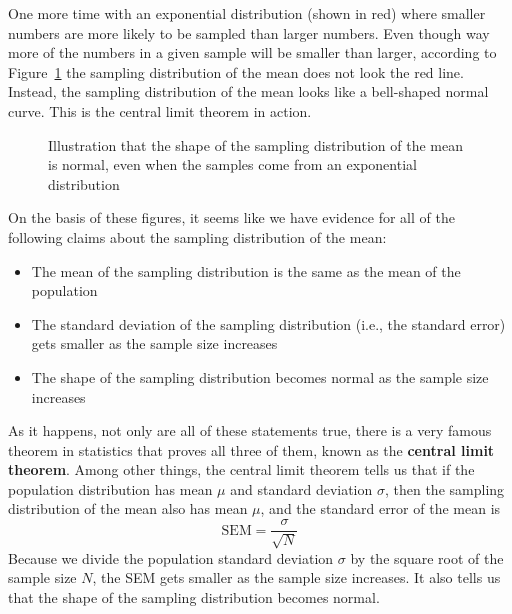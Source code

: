 \documentclass[
  letterpaper,
  DIV=11,
  numbers=noendperiod]{scrreprt}
\begin{document}
One more time with an exponential distribution (shown in red) where
smaller numbers are more likely to be sampled than larger numbers. Even
though way more of the numbers in a given sample will be smaller than
larger, according to Figure~\ref{fig-4samplemeanExp} the sampling
distribution of the mean does not look the red line. Instead, the
sampling distribution of the mean looks like a bell-shaped normal curve.
This is the central limit theorem in action.

\begin{figure}


\caption{\label{fig-4samplemeanExp}Illustration that the shape of the
sampling distribution of the mean is normal, even when the samples come
from an exponential distribution}

\end{figure}%

On the basis of these figures, it seems like we have evidence for all of
the following claims about the sampling distribution of the mean:

\begin{itemize}
\item
  The mean of the sampling distribution is the same as the mean of the
  population
\item
  The standard deviation of the sampling distribution (i.e., the
  standard error) gets smaller as the sample size increases
\item
  The shape of the sampling distribution becomes normal as the sample
  size increases
\end{itemize}

As it happens, not only are all of these statements true, there is a
very famous theorem in statistics that proves all three of them, known
as the \textbf{central limit theorem}. Among other things, the central
limit theorem tells us that if the population distribution has mean
\(\mu\) and standard deviation \(\sigma\), then the sampling
distribution of the mean also has mean \(\mu\), and the standard error
of the mean is \[\mbox{SEM} = \frac{\sigma}{ \sqrt{N} }\] Because we
divide the population standard deviation \(\sigma\) by the square root
of the sample size \(N\), the SEM gets smaller as the sample size
increases. It also tells us that the shape of the sampling distribution
becomes normal.
\end{document}
